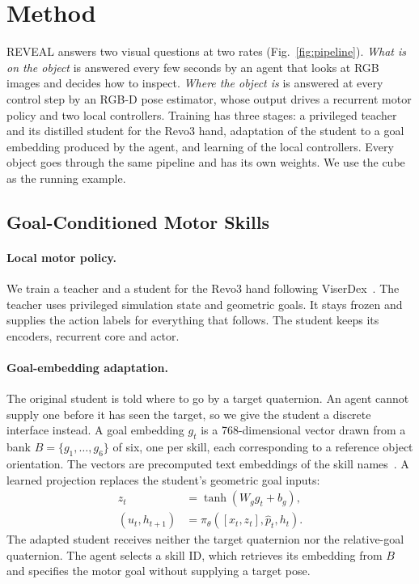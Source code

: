 \section{Method}
\label{sec:method}
REVEAL answers two visual questions at two rates (Fig.~\ref{fig:pipeline}). \emph{What is on the object} is answered every few seconds by an agent that looks at RGB images and decides how to inspect. \emph{Where the object is} is answered at every control step by an RGB-D pose estimator, whose output drives a recurrent motor policy and two local controllers. Training has three stages: a privileged teacher and its distilled student for the Revo3 hand, adaptation of the student to a goal embedding produced by the agent, and learning of the local controllers. Every object goes through the same pipeline and has its own weights. We use the cube as the running example.



\subsection{Goal-Conditioned Motor Skills}
\paragraph{Local motor policy.}
We train a teacher and a student for the Revo3 hand following ViserDex~\cite{bhardwaj2026viserdex}. The teacher uses privileged simulation state and geometric goals. It stays frozen and supplies the action labels for everything that follows. The student keeps its encoders, recurrent core and actor.

\paragraph{Goal-embedding adaptation.}
The original student is told where to go by a target quaternion. An agent cannot supply one before it has seen the target, so we give the student a discrete interface instead. A goal embedding $g_t$ is a 768-dimensional vector drawn from a bank $B=\{g_1,\ldots,g_6\}$ of six, one per skill, each corresponding to a reference object orientation. The vectors are precomputed text embeddings of the skill names~\cite{tschannen2025siglip2}. A learned projection replaces the student's geometric goal inputs:
\begin{align}
 z_t&=\tanh(W_g g_t+b_g),\\
 (u_t,h_{t+1})&=\pi_\theta([x_t,z_t],\hat p_t,h_t).
\label{eq:student}
\end{align}
The adapted student receives neither the target quaternion nor the relative-goal quaternion. The agent selects a skill ID, which retrieves its embedding from $B$ and specifies the motor goal without supplying a target pose.

